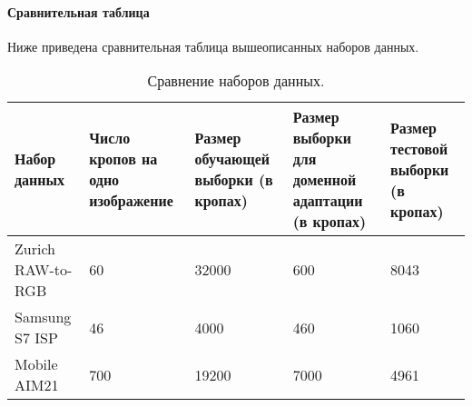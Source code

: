 \paragraph{Сравнительная таблица}

Ниже приведена сравнительная таблица вышеописанных наборов данных.

\begin{table}[H]
    \caption{Сравнение наборов данных.}\label{tab:datasets}
    \begin{tabular}{|p{3.5cm}|p{2.7cm}|p{2.7cm}|p{2.7cm}|p{2.7cm}|}
        \hline
        {Набор данных} & {Число кропов на одно изображение} & {Размер обучающей выборки (в кропах)} & {Размер выборки для доменной адаптации (в кропах)} & {Размер тестовой выборки (в кропах)} \\
        \hline
        Zurich RAW-to-RGB & 60 & 32000 & 600 & 8043 \\
        \hline
        Samsung S7 ISP & 46 & 4000 & 460 & 1060 \\
        \hline
        Mobile AIM21 & 700 & 19200 & 7000 & 4961 \\
        \hline
    \end{tabular}
\end{table}

